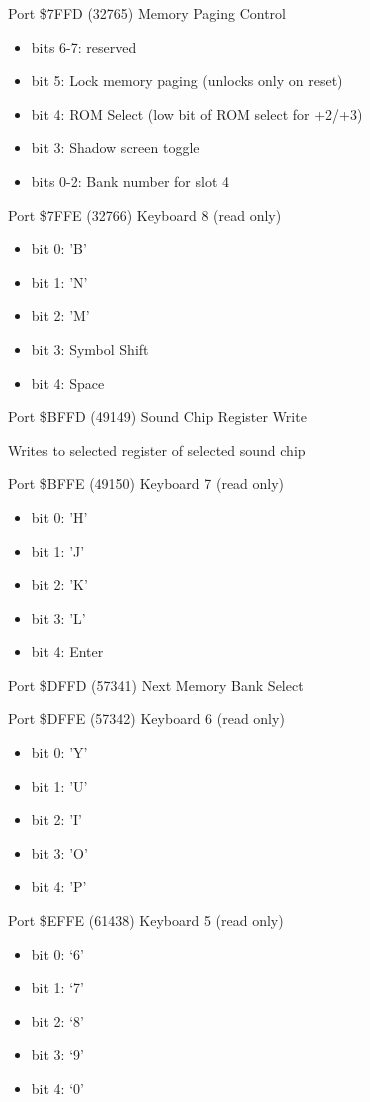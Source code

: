 Port \$7FFD (32765) Memory Paging Control
\begin{itemize}
\item[] bits 6-7: reserved
\item[] bit 5: Lock memory paging (unlocks only on reset)
\item[] bit 4: ROM Select (low bit of ROM select for +2/+3)
\item[] bit 3: Shadow screen toggle
\item[] bits 0-2: Bank number for slot 4
\end{itemize}

Port \$7FFE (32766) Keyboard 8 (read only)
\begin{itemize}
\item[] bit 0: 'B'
\item[] bit 1: 'N'
\item[] bit 2: 'M'
\item[] bit 3: Symbol Shift
\item[] bit 4: Space
\end{itemize}

Port \$BFFD (49149) Sound Chip Register Write

Writes to selected register of selected sound chip

Port \$BFFE (49150) Keyboard 7 (read only)
\begin{itemize}
\item[] bit 0: 'H'
\item[] bit 1: 'J'
\item[] bit 2: 'K'
\item[] bit 3: 'L'
\item[] bit 4: Enter
\end{itemize}

Port \$DFFD (57341) Next Memory Bank Select

Port \$DFFE (57342) Keyboard 6 (read only)
\begin{itemize}
\item[] bit 0: 'Y'
\item[] bit 1: 'U'
\item[] bit 2: 'I'
\item[] bit 3: 'O'
\item[] bit 4: 'P'
\end{itemize}

Port \$EFFE (61438) Keyboard 5 (read only)
\begin{itemize}
\item[] bit 0: ‘6’
\item[] bit 1: ‘7’
\item[] bit 2: ‘8’
\item[] bit 3: ‘9’
\item[] bit 4: ‘0’
\end{itemize}

